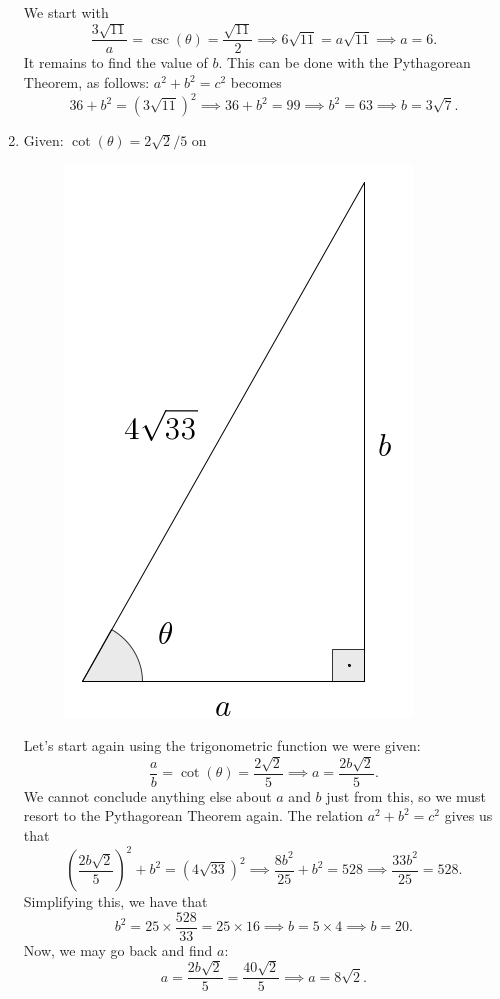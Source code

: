 \documentclass{ximera}
\begin{document}
\begin{example}
\begin{enumerate}[label=\alph*.]
    \begin{explanation}
      We start with $$\frac{3\sqrt{11}}{a} = \csc(\theta) = \frac{\sqrt{11}}{2} \implies 6\sqrt{11} = a\sqrt{11} \implies a = 6.$$It remains to find the value of $b$. This can be done with the Pythagorean Theorem, as follows: $a^2+b^2=c^2$ becomes  $$36 + b^2 = (3\sqrt{11})^2 \implies 36+b^2 = 99 \implies b^2= 63 \implies b = 3\sqrt{7}.$$
    \end{explanation}
  \item Given: $\cot(\theta) = 2\sqrt{2}/5$ on     \begin{figure}[h]
      \centering
      \includegraphics[scale=.3]{./figures/9-1-2-triangle-4sqrt33.png}
    \end{figure}

    
    \begin{explanation}
      Let's start again using the trigonometric function we were given: $$\frac{a}{b} = \cot(\theta) = \frac{2\sqrt{2}}{5} \implies a= \frac{2b\sqrt{2}}{5}.$$We cannot conclude anything else about $a$ and $b$ just from this, so we must resort to the Pythagorean Theorem again. The relation $a^2+b^2=c^2$ gives us that $$\left(\frac{2b\sqrt{2}}{5}\right)^2+b^2 = (4\sqrt{33})^2 \implies \frac{8b^2}{25}+b^2 = 528 \implies \frac{33b^2}{25} = 528.$$Simplifying this, we have that $$b^2 = 25\times \frac{528}{33} = 25\times 16 \implies b = 5\times 4 \implies b=20.$$Now, we may go back and find $a$: $$a = \frac{2b\sqrt{2}}{5}= \frac{40\sqrt{2}}{5} \implies a = 8\sqrt{2}.$$
    \end{explanation}
  \end{enumerate}
\end{example}
\end{document}
